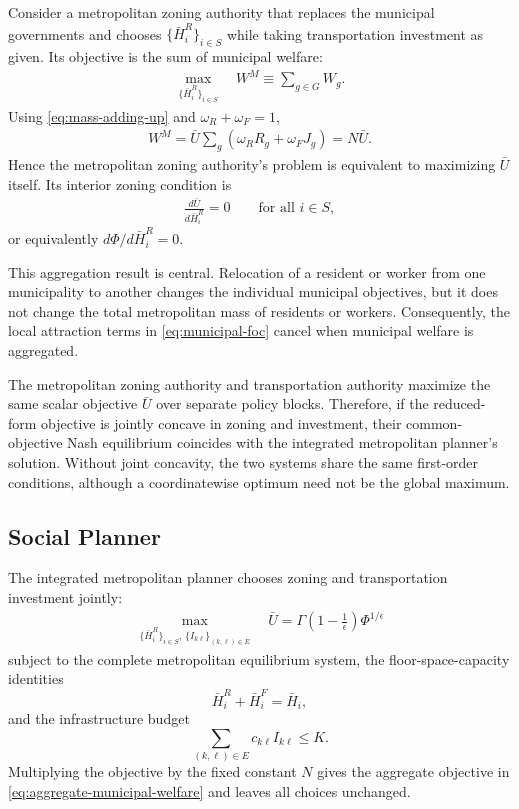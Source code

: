 \documentclass[12pt, a4paper]{article}
\theoremstyle{definition}
\theoremstyle{remark}
\begin{document}
Consider a metropolitan zoning authority that replaces the municipal governments and chooses $\{\bar H_i^R\}_{i\in S}$ while taking transportation investment as given. Its objective is the sum of municipal welfare:
\begin{align}
    \label{eq:metro-zoning-problem}
    \max_{\{\bar H_i^R\}_{i\in S}}
    \quad
    W^M
    \equiv
    \sum_{g\in G}W_g.
\end{align}
Using \eqref{eq:mass-adding-up} and $\omega_R+\omega_F=1$,
\begin{align}
    \label{eq:aggregate-municipal-welfare}
    W^M
    =
    \bar U
    \sum_g
    \left(
    \omega_RR_g+\omega_FJ_g
    \right)
    =
    N\bar U.
\end{align}
Hence the metropolitan zoning authority's problem is equivalent to maximizing $\bar U$ itself. Its interior zoning condition is
\begin{align}
    \label{eq:metro-zoning-foc}
    \frac{d\bar U}{d\bar H_i^R}=0
    \qquad
    \text{for all }i\in S,
\end{align}
or equivalently $d\Phi/d\bar H_i^R=0$.

This aggregation result is central. Relocation of a resident or worker from one municipality to another changes the individual municipal objectives, but it does not change the total metropolitan mass of residents or workers. Consequently, the local attraction terms in \eqref{eq:municipal-foc} cancel when municipal welfare is aggregated.

The metropolitan zoning authority and transportation authority maximize the same scalar objective $\bar U$ over separate policy blocks. Therefore, if the reduced-form objective is jointly concave in zoning and investment, their common-objective Nash equilibrium coincides with the integrated metropolitan planner's solution. Without joint concavity, the two systems share the same first-order conditions, although a coordinatewise optimum need not be the global maximum.


\subsection{Social Planner}

The integrated metropolitan planner chooses zoning and transportation investment jointly:
\begin{align}
    \label{eq:SP-problem}
    \max_{\{\bar H_i^R\}_{i\in S},\,\{I_{k\ell}\}_{(k,\ell)\in E}}
    \quad
    \bar U
    =
    \Gamma\!\left(1-\tfrac1\epsilon\right)\Phi^{1/\epsilon}
\end{align}
subject to the complete metropolitan equilibrium system, the floor-space-capacity identities
\[
\bar H_i^R+\bar H_i^F=\bar H_i,
\]
and the infrastructure budget
\[
\sum_{(k,\ell)\in E}c_{k\ell}I_{k\ell}\leq K.
\]
Multiplying the objective by the fixed constant $N$ gives the aggregate objective in \eqref{eq:aggregate-municipal-welfare} and leaves all choices unchanged.
\end{document}
